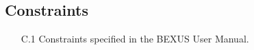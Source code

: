 \subsection{Constraints}

\begin{enumerate}
    \item[C.1] Constraints specified in the BEXUS User Manual.
\end{enumerate}